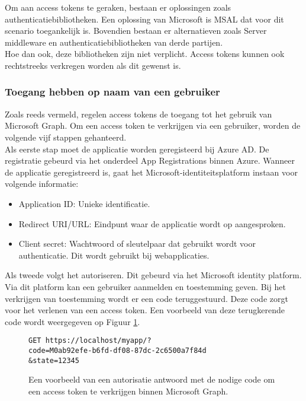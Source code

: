 Om aan access tokens te geraken, bestaan er oplossingen zoals authenticatiebibliotheken. Een oplossing van Microsoft is \ac{MSAL} dat voor dit scenario toegankelijk is. Bovendien bestaan er alternatieven zoals Server middleware en authenticatiebibliotheken van derde partijen. \\

Hoe dan ook, deze bibliotheken zijn niet verplicht. Access tokens kunnen ook rechtstreeks verkregen worden als dit gewenst is. 

\subsubsection{Toegang hebben op naam van een gebruiker}

Zoals reeds vermeld, regelen access tokens de toegang tot het gebruik van Microsoft Graph. Om een access token te verkrijgen via een gebruiker, worden de volgende vijf stappen gehanteerd. \\

Als eerste stap moet de applicatie worden geregisteerd bij Azure \ac{AD}. De registratie gebeurd via het onderdeel App Registrations binnen Azure. Wanneer de applicatie geregistreerd is, gaat het Microsoft-identiteitsplatform instaan voor volgende informatie: 

\begin{itemize}
    \item Application ID: Unieke identificatie.
    \item Redirect URI/URL: Eindpunt waar de applicatie wordt op aangesproken.
    \item Client secret: Wachtwoord of sleutelpaar dat gebruikt wordt voor authenticatie. Dit wordt gebruikt bij webapplicaties.
\end{itemize}

Als tweede volgt het autoriseren. Dit gebeurd via het Microsoft identity platform. Via dit platform kan een gebruiker aanmelden en toestemming geven. Bij het verkrijgen van toestemming wordt er een code teruggestuurd. Deze code zorgt voor het verlenen van een access token. Een voorbeeld van deze terugkerende code wordt weergegeven op Figuur \ref{MSGAR}. \\

\begin{figure}[h]
    \footnotesize
    \begin{verbatim}
GET https://localhost/myapp/?
code=M0ab92efe-b6fd-df08-87dc-2c6500a7f84d
&state=12345
    \end{verbatim}    
    \caption[Voorbeeld Microsoft Graph Authorization response]{Een voorbeeld van een autorisatie antwoord met de nodige code om een access token te verkrijgen binnen Microsoft Graph.}
    \label{MSGAR}
\end{figure}

